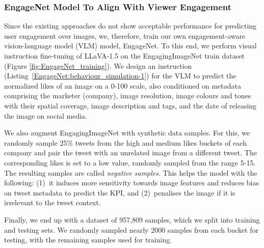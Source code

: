  
 \subsubsection{EngageNet Model To Align With Viewer Engagement}
 \label{sec:EngageNet}
 
 Since the existing approaches do not show acceptable performance for predicting user engagement over images, we, therefore, train our own engagement-aware vision-language model (VLM) model, EngageNet. To this end, we perform visual instruction fine-tuning of LLaVA-1.5 \cite{liu2023visual} on the EngagingImageNet train dataset (Figure \ref{fig:EngageNet_training}). We design an instruction (Listing~\ref{EngageNet:behaviour_simulation-1}) for the VLM to predict the normalized likes of an image on a 0-100 scale, also conditioned on metadata comprising the marketer (company), image resolution, image colours and tones with their spatial coverage, image description and tags, and the date of releasing the image on social media. 


 We also augment EngagingImageNet with synthetic data samples. For this, we randomly sample 25\% tweets from the high and medium likes buckets of each company and pair the tweet with an unrelated image from a different tweet. The corresponding likes is set to a low value, randomly sampled from the range 5-15. The resulting samples are called \textit{negative samples}. This helps the model with the following: (1)~it induces more sensitivity towards image features and reduces bias on tweet metadata to predict the KPI, and (2)~penalises the image if it is irrelevant to the tweet context. 
 
 Finally, we end up with a dataset of 957,809 samples, which we split into training and testing sets. We randomly sampled nearly 2000 samples from each bucket for testing, with the remaining samples used for training.  
 
 
